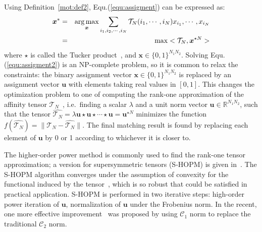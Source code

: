 Using Definition~\ref{mot:def2}, Equ.(\ref{equ:assigment}) can be expressed as:
\begin{eqnarray}
\label{equ:assigment2}
{\boldsymbol{x}}^* &=& \operatorname*{arg\,max}_{\boldsymbol{x}} \sum_{i_1,i_2,\cdots,i_N} \mathcal{T}_N(i_1,\cdots,i_N) x_{i_1},\cdots,x_{i_N} \nonumber\\
&=& \max <\mathcal{T}_N, \boldsymbol{x}^{\star N}>
\end{eqnarray}
where $\star$ is called the Tucker product~\cite{Kofidis02}, and $\boldsymbol{x} \in \{0,1\}^{N_1N_2}$.
Solving Equ.(\ref{equ:assigment2}) is an NP-complete problem,
so it is common to relax the constraints:
the binary assignment vector $\boldsymbol{x}\in \{0,1\}^{N_1N_2}$ is replaced by an assignment vector $\boldsymbol{u}$ with elements taking real values in $[0,1]$.
This changes the optimization problem to one of computing the rank-one approximation of the affinity tensor $\mathcal{T}_N$~\cite{Kofidis02},
i.e.\ finding a scalar $\lambda$ and a unit norm vector $\boldsymbol{u}\in \mathbb{R}^{N_1N_2}$,
such that the tensor $\hat{\mathcal{T}_N} = \lambda \boldsymbol{u}\star \boldsymbol{u} \star\cdots \star \boldsymbol{u}=\boldsymbol{u}^{\star N}$ minimizes the function $f(\hat{\mathcal{T}_N})=\lVert \mathcal{T}_N-\hat{\mathcal{T}_N} \lVert$.
The final matching result is found by replacing each element of $\boldsymbol{u}$ by 0 or 1 according to whichever it is closer to.

The higher-order power method is commonly used to find the rank-one tensor approximation;
a version for supersymmetric tensors (S-HOPM) is given in~\cite{Kofidis02}.
The S-HOPM algorithm converges under the assumption of convexity for the functional induced by the tensor~\cite{Kofidis02},
which is so robust that could be satisfied in practical application.
S-HOPM is performed in two iterative steps: high-order power iteration of $\boldsymbol{u}$, normalization of $\boldsymbol{u}$ under the Frobenius norm.
In the recent, one more effective improvement~\cite{Duchenne09} was proposed by using $\mathcal{C}_1$ norm to replace the traditional $\mathcal{C}_2$ norm.

